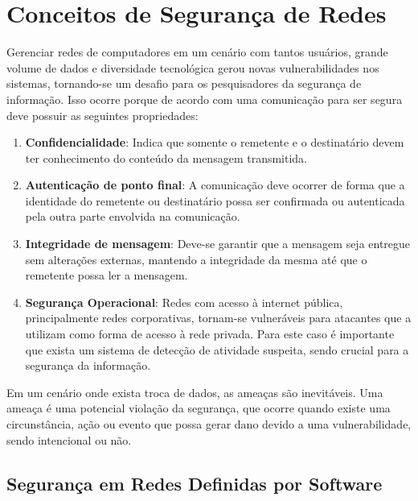 \section{Conceitos de Segurança de Redes}

\par Gerenciar redes de computadores em um cenário com tantos usuários, grande volume de dados e diversidade tecnológica gerou novas vulnerabilidades nos sistemas, tornando-se um desafio para os pesquisadores da segurança de informação. Isso ocorre porque de acordo com  uma comunicação para ser segura deve possuir as seguintes propriedades:

\begin{enumerate}
    \item \textbf{Confidencialidade}:  Indica que somente o remetente e o destinatário devem ter conhecimento do conteúdo da mensagem transmitida.
    
    \item \textbf{Autenticação de ponto final}: A comunicação deve ocorrer de forma que a identidade do remetente ou destinatário possa ser confirmada ou autenticada pela outra parte envolvida na comunicação.
    
    \item \textbf{Integridade de mensagem}: Deve-se garantir que a mensagem seja entregue sem alterações externas, mantendo a integridade da mesma até que o remetente possa ler a mensagem.
    
    \item \textbf{Segurança Operacional}: Redes com acesso à internet pública, principalmente redes corporativas, tornam-se vulneráveis para atacantes que a utilizam como forma de acesso à rede privada. Para este caso é importante que exista um sistema de detecção de atividade suspeita, sendo crucial para a segurança da informação.
    
\end{enumerate}

 Em um cenário onde exista troca de dados, as ameaças são inevitáveis. Uma ameaça é uma potencial violação da segurança, que ocorre quando existe uma circunstância, ação ou evento que possa gerar dano devido a uma vulnerabilidade, sendo intencional ou não.\cite{rfc2828}
 
 
 
\subsection{Segurança em Redes Definidas por Software}

